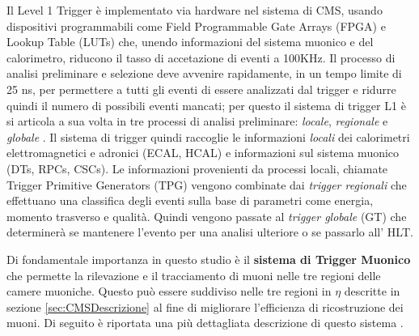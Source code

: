 Il Level 1 Trigger è implementato via hardware nel sistema di CMS, usando dispositivi programmabili come Field Programmable Gate Arrays (FPGA) e Lookup Table (LUTs) che, unendo informazioni del sistema muonico e del calorimetro, riducono il tasso di accetazione di eventi a 100KHz. Il processo di analisi preliminare e selezione deve avvenire rapidamente, in un tempo limite di 25 ns, per permettere a tutti gli eventi di essere analizzati dal trigger e ridurre quindi il numero di possibili eventi mancati; per questo il sistema di trigger L1 è si articola a sua volta in tre processi di analisi preliminare: \textit{locale}, \textit{regionale} e \textit{globale} \cite{MasterThesisNicLai}.
Il sistema di trigger quindi raccoglie le informazioni \textit{locali} dei calorimetri elettromagnetici e adronici (ECAL, HCAL) e informazioni sul sistema muonico (DTs, RPCs, CSCs). Le informazioni provenienti da processi locali, chiamate Trigger Primitive Generators (TPG) vengono combinate dai \textit{trigger regionali} che effettuano una classifica degli eventi sulla base di parametri come energia, momento trasverso e qualità. Quindi vengono passate al \textit{trigger globale} (GT) che determinerà se mantenere l'evento per una analisi ulteriore o se passarlo all' HLT.


Di fondamentale importanza in questo studio è il \textbf{sistema di Trigger Muonico} che permette la rilevazione e il tracciamento di muoni nelle tre regioni delle camere muoniche. Questo può essere suddiviso nelle tre regioni in $\eta$ descritte in sezione \ref{sec:CMSDescrizione} al fine di migliorare l'efficienza di ricostruzione dei muoni. Di seguito è riportata una più dettagliata descrizione di questo sistema \cite{sirunyan2020performance}.


